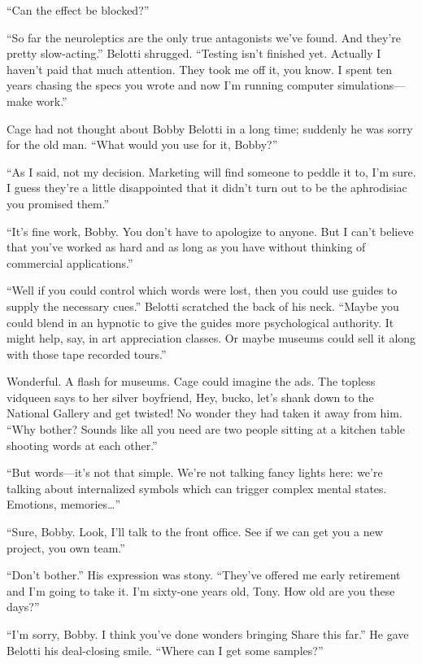 ``Can the effect be blocked?''

``So far the neuroleptics are the only true antagonists we've found. And they're pretty slow-acting.'' Belotti shrugged. ``Testing isn't finished yet. Actually I haven't paid that much attention. They took me off it, you know. I spent ten years chasing the specs you wrote and now I'm running computer simulations---make work.''

Cage had not thought about Bobby Belotti in a long time; suddenly he was sorry for the old man. ``What would you use for it, Bobby?''

``As I said, not my decision. Marketing will find someone to peddle it to, I'm sure. I guess they're a little disappointed that it didn't turn out to be the aphrodisiac you promised them.''

``It's fine work, Bobby. You don't have to apologize to anyone. But I can't believe that you've worked as hard and as long as you have without thinking of commercial applications.''

``Well if you could control which words were lost, then you could use guides to supply the necessary cues.'' Belotti scratched the back of his neck. ``Maybe you could blend in an hypnotic to give the guides more psychological authority. It might help, say, in art appreciation classes. Or maybe museums could sell it along with those tape recorded tours.''

Wonderful. A flash for museums. Cage could imagine the ads. The topless vidqueen says to her silver boyfriend, Hey, bucko, let's shank down to the National Gallery and get twisted! No wonder they had taken it away from him. ``Why bother? Sounds like all you need are two people sitting at a kitchen table shooting words at each other.''

``But words---it's not that simple. We're not talking fancy lights here: we're talking about internalized symbols which can trigger complex mental states. Emotions, memories…''

``Sure, Bobby. Look, I'll talk to the front office. See if we can get you a new project, you own team.''

``Don't bother.'' His expression was stony. ``They've offered me early retirement and I'm going to take it. I'm sixty-one years old, Tony. How old are you these days?''

``I'm sorry, Bobby. I think you've done wonders bringing Share this far.'' He gave Belotti his deal-closing smile. ``Where can I get some samples?''

